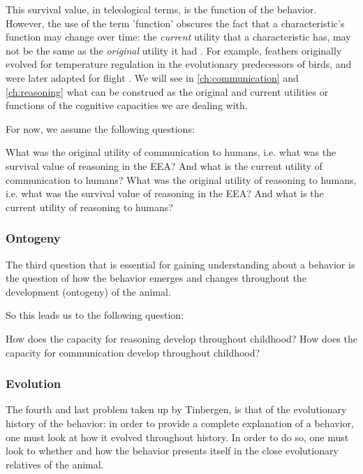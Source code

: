 This survival value, in teleological terms, is the function of the behavior.  However, the use of the term 'function' obscures the fact that a characteristic's function may change over time: the \emph{current} utility that a characteristic has, may not be the same as the \emph{original} utility it had \citep{BatesonLaland13}. For example, feathers originally evolved for temperature regulation in the evolutionary predecessors of birds, and were later adapted for flight \citep{Benton19, BatesonLaland13}.
We will see in \cref{ch:communication} and \cref{ch:reasoning} what can be construed as the original and current utilities or functions of the cognitive capacities we are dealing with.

For now, we assume the following questions:
\begin{exe}
    \ex
    \begin{xlist}
        \ex
        What was the original utility of communication to humans, i.e. what was the survival value of reasoning in the EEA? And what is the current utility of communication to humans?
        \ex
        What was the original utility of reasoning to humans, i.e. what was the survival value of reasoning in the EEA? And what is the current utility of reasoning to humans?
    \end{xlist}
\end{exe}

\subsubsection{Ontogeny}
The third question that is essential for gaining understanding about a behavior is the question of how the behavior emerges and changes throughout the development (ontogeny) of the animal.

So this leads us to the following question:
\begin{exe}
    \ex
    \begin{xlist}
        \ex How does the capacity for reasoning develop throughout childhood?
        \ex How does the capacity for communication develop throughout childhood?
    \end{xlist}
\end{exe}

\subsubsection{Evolution}
The fourth and last problem taken up by Tinbergen, is that of the evolutionary history of the behavior: in order to provide a complete explanation of a behavior, one must look at how it evolved throughout history. In order to do so, one must look to whether and how the behavior presents itself in the close evolutionary relatives of the animal.

